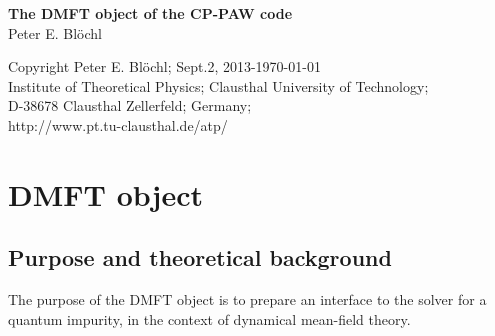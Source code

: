 \documentclass[11pt,a4paper]{report}
\begin{document}
\begin{titlepage}
\begin{center}
\vspace*{3.5cm}
{\huge \textbf{The DMFT object of the CP-PAW code}}\\
\vspace{0.5cm}
{\large Peter E. Bl\"ochl}
\vspace{0.5cm} 
\end{center}

\vfill
\begin{center}
Copyright Peter E. Bl\"ochl; Sept.2, 2013-\today\\
{\small
Institute of Theoretical Physics;
Clausthal University of Technology;\\ 
D-38678 Clausthal Zellerfeld; Germany;\\
http://www.pt.tu-clausthal.de/atp/}
\end{center}
\end{titlepage}
\noindent            
\tableofcontents
\chapter{DMFT object}
\section{Purpose and theoretical background}
The purpose of the DMFT object is to prepare an interface to the
solver for a quantum impurity, in the context of dynamical mean-field
theory.

\end{document}
